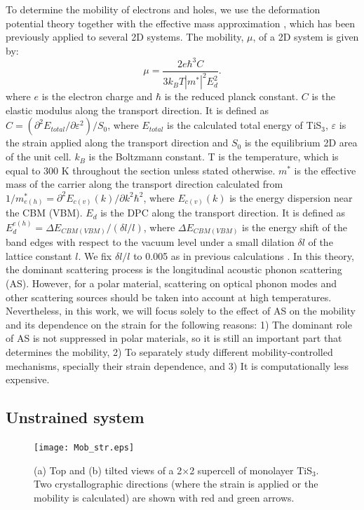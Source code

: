 To determine the mobility of electrons and  holes, we use the deformation potential theory together with the effective mass approximation \cite{Bardeen1950}, which has been previously applied to several 2D systems\cite{Xi2012,Qiao2014a,Dai2015,Kang2015}.
The mobility, $\mu$, of a 2D system is given by: 
\begin{equation} \label{equ}
\mu=\frac{2e\hbar^3C}{3k_BT|m^*|^2E_d^2}.
\end{equation}
where $e$ is the electron charge and $\hbar$ is the reduced planck constant. $C$ is the elastic modulus along the transport direction. It is defined as $C=(\partial^2E_{total}/\partial\varepsilon^2)/S_0$, where $E_{total}$ is the calculated total energy of TiS$_3$, $\varepsilon$ is the strain applied along the transport direction and $S_0$ is the equilibrium 2D area of the unit cell. $k_B$ is the Boltzmann constant. T is the temperature, which is equal to 300 K throughout the section unless stated otherwise. $m^*$ is the effective mass of the carrier along the transport direction calculated from $1/m^*_{e(h)}=\partial^2E_{c(v)}(k)/\partial k^2\hbar^2$, where $E_{c(v)}(k)$ is the energy dispersion near the CBM (VBM). $E_d$ is the DPC along the transport direction. It is defined as $E_d^{e(h)}=\Delta E_{CBM(VBM)}/(\delta l/l)$, where $\Delta E_{CBM(VBM)}$ is the energy shift of the band edges with respect to the vacuum level under a small dilation $\delta l$ of the lattice constant $l$. We fix $\delta l/l$ to 0.005 as in previous calculations \cite{Dai2015}. In this theory,  the dominant scattering process is the longitudinal acoustic phonon scattering (AS). However, for a polar material, scattering on  optical phonon modes and other scattering sources should be taken into account at high temperatures\cite{Kaasbjerg2012}. Nevertheless, in this work, we will focus solely to the effect of AS on the mobility and its dependence on the strain for the following reasons: 1) The dominant role of AS is not suppressed in polar materials, so it is still an important part that determines the mobility, 2) To separately study different mobility-controlled mechanisms, specially their strain dependence, and 3) It is computationally less expensive. 


\subsection{Unstrained system}

\begin{figure}[htb]
\centering
\texttt{[image: Mob\_str.eps]}
\caption{(a) Top and (b) tilted views of a 2$\times$2 supercell of monolayer TiS$_3$.  Two crystallographic directions (where the strain is applied or the mobility is calculated) are shown with red and green arrows. \label{tis3_structure} }
\end{figure}

